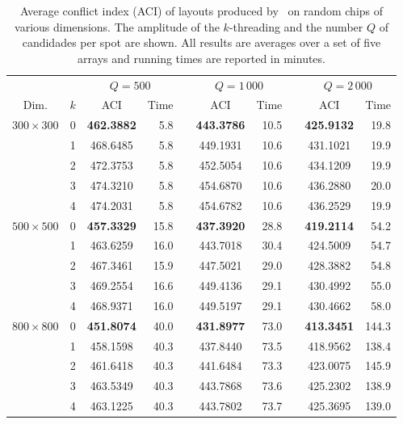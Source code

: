 \begin{table}[p!]\centering
\caption{\label{tab:greedyplus_aci}
  Average conflict index (ACI) of layouts produced by \Greedyplus\ on random
  chips of various dimensions. The amplitude of the $k$-threading and the number
  $Q$ of candidades per spot are shown. All results are averages over a set of
  five arrays and running times are reported in minutes.}
\footnotesize{
\begin{tabular}{crcrlcrlcr}
\vspace{1pt}
     &     & \multicolumn{2}{c}{$Q=500$} & & \multicolumn{2}{c}{$Q=1\,000$} & & \multicolumn{2}{c}{$Q=2\,000$} \\ \cline{3-4} \cline{6-7} \cline{9-10}
\vspace{1pt}
Dim. & $k$ & ACI & Time & & ACI & Time & & ACI & Time \\
\hline
$300\times 300$ &  0 & {\bf 462.3882} &  5.8 &  & {\bf 443.3786} & 10.5 &  & {\bf 425.9132} &  19.8 \\
                &  1 &      468.6485  &  5.8 &  &      449.1931  & 10.6 &  &      431.1021  &  19.9 \\
                &  2 &      472.3753  &  5.8 &  &      452.5054  & 10.6 &  &      434.1209  &  19.9 \\
                &  3 &      474.3210  &  5.8 &  &      454.6870  & 10.6 &  &      436.2880  &  20.0 \\
                &  4 &      474.2031  &  5.8 &  &      454.6782  & 10.6 &  &      436.2529  &  19.9 \\
\hline
$500\times 500$ &  0 & {\bf 457.3329} & 15.8 &  & {\bf 437.3920} & 28.8 &  & {\bf 419.2114} &  54.2 \\
                &  1 &      463.6259  & 16.0 &  &      443.7018  & 30.4 &  &      424.5009  &  54.7 \\
                &  2 &      467.3461  & 15.9 &  &      447.5021  & 29.0 &  &      428.3882  &  54.8 \\
                &  3 &      469.2554  & 16.6 &  &      449.4136  & 29.1 &  &      430.4992  &  55.0 \\
                &  4 &      468.9371  & 16.0 &  &      449.5197  & 29.1 &  &      430.4662  &  58.0 \\
\hline
$800\times 800$ &  0 & {\bf 451.8074} & 40.0 &  & {\bf 431.8977} & 73.0 &  & {\bf 413.3451} & 144.3 \\
                &  1 &      458.1598  & 40.3 &  &      437.8440  & 73.5 &  &      418.9562  & 138.4 \\
                &  2 &      461.6418  & 40.3 &  &      441.6484  & 73.3 &  &      423.0075  & 145.9 \\
                &  3 &      463.5349  & 40.3 &  &      443.7868  & 73.6 &  &      425.2302  & 138.9 \\
                &  4 &      463.1225  & 40.3 &  &      443.7802  & 73.7 &  &      425.3695  & 139.0 \\
\hline
\end{tabular}}
\end{table}


